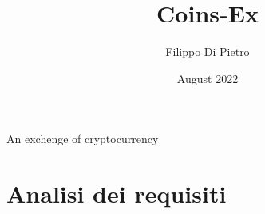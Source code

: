 \documentclass{article}
\title{Coins-Ex}
\author{Filippo Di Pietro}
\date{August 2022}
\begin{document}
\maketitle
\begin{center}
An exchenge of cryptocurrency
\end{center}
\newpage
\section{Analisi dei requisiti}
\end{document}
